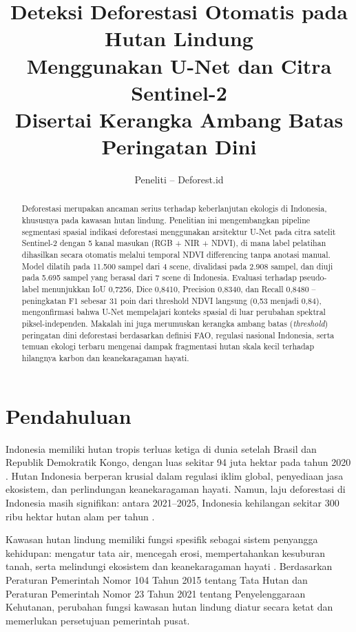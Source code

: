 \documentclass[12pt,a4paper]{article}
\title{\textbf{Deteksi Deforestasi Otomatis pada Hutan Lindung \\
Menggunakan U-Net dan Citra Sentinel-2} \\
\large Disertai Kerangka Ambang Batas Peringatan Dini}
\author{Peneliti -- Deforest.id}
\date{}
\begin{document}
\maketitle
\thispagestyle{empty}

\begin{abstract}
Deforestasi merupakan ancaman serius terhadap keberlanjutan ekologis di Indonesia,
khususnya pada kawasan hutan lindung. Penelitian ini mengembangkan pipeline
segmentasi spasial indikasi deforestasi menggunakan arsitektur U-Net pada citra
satelit Sentinel-2 dengan 5 kanal masukan (RGB + NIR + NDVI), di mana label
pelatihan dihasilkan secara otomatis melalui temporal NDVI differencing tanpa
anotasi manual. Model dilatih pada 11.500 sampel dari 4 scene, divalidasi pada
2.908 sampel, dan diuji pada 5.695 sampel yang berasal dari 7 scene di Indonesia.
Evaluasi terhadap pseudo-label menunjukkan IoU 0,7256, Dice 0,8410, Precision
0,8340, dan Recall 0,8480 -- peningkatan F1 sebesar 31 poin dari threshold NDVI
langsung (0,53 menjadi 0,84), mengonfirmasi bahwa U-Net mempelajari konteks
spasial di luar perubahan spektral piksel-independen. Makalah ini juga merumuskan
kerangka ambang batas (\textit{threshold}) peringatan dini deforestasi berdasarkan
definisi FAO, regulasi nasional Indonesia, serta temuan ekologi terbaru mengenai
dampak fragmentasi hutan skala kecil terhadap hilangnya karbon dan
keanekaragaman hayati.
\end{abstract}

\section{Pendahuluan}
\label{sec:pendahuluan}

Indonesia memiliki hutan tropis terluas ketiga di dunia setelah Brasil dan
Republik Demokratik Kongo, dengan luas sekitar 94 juta hektar pada tahun 2020
\cite{fao2020fra}. Hutan Indonesia berperan krusial dalam regulasi iklim global,
penyediaan jasa ekosistem, dan perlindungan keanekaragaman hayati. Namun, laju
deforestasi di Indonesia masih signifikan: antara 2021--2025, Indonesia kehilangan
sekitar 300 ribu hektar hutan alam per tahun \cite{fao2022sofo}.

Kawasan hutan lindung memiliki fungsi spesifik sebagai sistem penyangga kehidupan:
mengatur tata air, mencegah erosi, mempertahankan kesuburan tanah, serta melindungi
ekosistem dan keanekaragaman hayati \cite{unfccc2022indonesia}. Berdasarkan
Peraturan Pemerintah Nomor 104 Tahun 2015 tentang Tata Hutan dan Peraturan
Pemerintah Nomor 23 Tahun 2021 tentang Penyelenggaraan Kehutanan, perubahan fungsi
kawasan hutan lindung diatur secara ketat dan memerlukan persetujuan pemerintah pusat.
\end{document}
